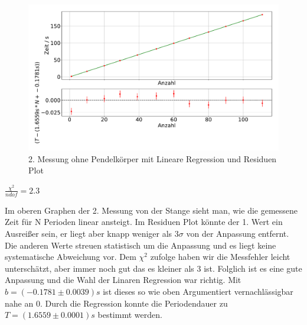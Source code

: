 \documentclass[twoside]{protokoll}
\begin{document}
\begin{figure}[H]
    \centering
    \includegraphics[width=1.0\textwidth]{plots/lineare_regression_stange_2.pdf}
    \caption{2. Messung ohne Pendelkörper mit Lineare Regression und Residuen Plot}
\end{figure}
\begin{center}
    $ \frac{\chi^2}{ndof}  =  2.3$
\end{center}
Im oberen Graphen der 2. Messung von der Stange sieht man, wie die gemessene Zeit für N Perioden linear ansteigt.
Im Residuen Plot könnte der 1. Wert ein Ausreißer sein, er liegt aber knapp weniger als $3\sigma$ von der Anpassung entfernt.
Die anderen Werte streuen statistisch um die Anpassung und es liegt keine systematische Abweichung vor.
Dem $\chi^2$ zufolge haben wir die Messfehler leicht unterschätzt, aber immer noch gut das es kleiner als 3 ist.
Folglich ist es eine gute Anpassung und die Wahl der Linaren Regression war richtig.
Mit $b = (-0.1781 \pm 0.0039)s$ ist dieses so wie oben Argumentiert vernachlässigbar nahe an 0.
Durch die Regression konnte die Periodendauer zu $T = (1.6559 \pm 0.0001)s$ bestimmt werden.
\end{document}
